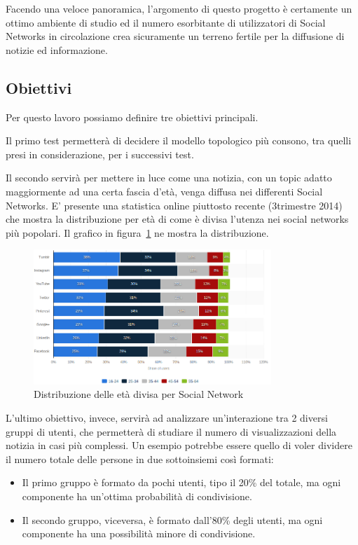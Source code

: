 Facendo una veloce panoramica, l'argomento di questo progetto è certamente un ottimo ambiente di studio
ed il numero esorbitante di utilizzatori di Social Networks in circolazione crea sicuramente 
un terreno fertile per la diffusione di notizie ed informazione.




\subsection{Obiettivi}
\label{section:obiettivi}

Per questo lavoro possiamo definire tre obiettivi principali.

Il primo test permetterà di decidere il modello topologico più consono, tra quelli 
presi in considerazione, per i successivi test.

Il secondo servirà per mettere in luce come una notizia, 
con un topic adatto maggiormente ad una certa fascia d'età, venga diffusa nei differenti Social Networks.
E' presente una statistica online piuttosto recente (3\degree trimestre 2014) che mostra la distribuzione 
per età di come è divisa l'utenza nei social networks più popolari. 
Il grafico in figura~\ref{img:age_distribution_social} ne mostra la distribuzione.

\begin{figure}[!ht]
 \centerline{
  \includegraphics[width=0.8\textwidth]{img/age-distribution.png}
 }
\caption{Distribuzione delle età divisa per Social Network ~\cite{biblio:age_distribution_social}}
\label{img:age_distribution_social}
\end{figure}


L'ultimo obiettivo, invece, servirà ad analizzare un'interazione tra 2 diversi gruppi di utenti, che 
permetterà di studiare il numero di visualizzazioni della notizia in casi più complessi.
Un esempio potrebbe essere quello di voler dividere il numero totale delle persone in due sottoinsiemi così formati:
\begin{itemize}
 \item Il primo gruppo è formato da pochi utenti, tipo il 20\% del totale, ma ogni componente ha un'ottima probabilità di condivisione.
 \item Il secondo gruppo, viceversa, è formato dall'80\% degli utenti, ma ogni componente ha una possibilità minore di condivisione.
\end{itemize}





